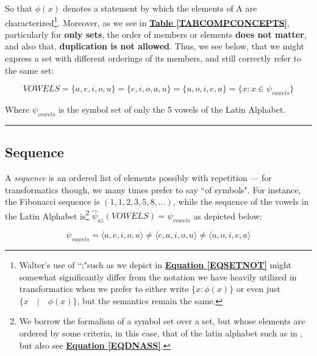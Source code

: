 \documentclass[a4paper, 18pt]{book} %
\begin{document}
\begin{appendices}
\vspace{2em}

So that $\phi(x)$ denotes a statement by which the elements of A are characterized\footnote{Walter's use of ``;"such as we depict in \textbf{\hyperref[EQSETNOT]{Equation \ref{EQSETNOT}}} might somewhat significantly differ from the notation we have heavily utilized in transformatics when we prefer to either write $\{x: \phi(x)\}$ or even just $\{x \quad|\quad \phi(x)\}$, but the semantics remain the same.}. Moreover, as we see in \textbf{\hyperref[TABCOMPCONCEPTS]{Table \ref{TABCOMPCONCEPTS}}}, particularly for \textbf{only sets}, the order of members or elements \textbf{does not matter}, and also that, \textbf{duplication is not allowed}. Thus, we see below, that we might express a set with different orderings of its members, and still correctly refer to the same set:

\begin{equation}
VOWELS = \{ a, e, i, o, u \} = \{ e, i, o, a, u \} = \{ u, o, i, e, a\} = \{x : x \in \psi_{vowels} \}
\end{equation}

\vspace{2em}

Where $\psi_{vowels}$ is the symbol set of only the 5 vowels of the Latin Alphabet.


\noindent\rule{\textwidth}{0.4pt}


\subsection*{Sequence}
\label{DEFSEQUENCE}

A \emph{sequence} is an ordered list of elements possibly with repetition\cite{copilot_dna_assistant} --- for transformatics though, we many times prefer to say ``of symbols". For instance, the Fibonacci sequence is $(1, 1, 2, 3, 5, 8, \dots)$, while the sequence of the vowels in the Latin Alphabet is\footnote{We borrow the formalism of a symbol set over a set, but whose elements are ordered by some criteria, in this case, that of the latin alphabet such as in \cite{transformatics}, but also see \textbf{\hyperref[EQDNASS]{Equation \ref{EQDNASS}}}.} $\hat{\psi}_{az}(VOWELS) = \psi_{vowels}$ as depicted below:


\begin{equation}
\psi_{vowels} = \langle a, e, i, o ,u \rangle \neq \langle e, a, i, o ,u \rangle \neq \langle u, o, i, e, a \rangle
\end{equation}



\end{appendices}
\end{document}
